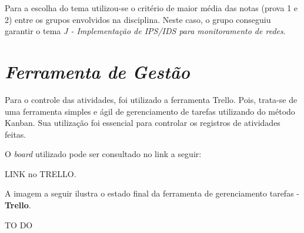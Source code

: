 		Para a escolha do tema utilizou-se o critério de maior média das notas (prova 1 e 2) entre os grupos envolvidos na disciplina. Neste caso, o grupo conseguiu garantir o tema \emph{J - Implementação de IPS/IDS para monitoramento de redes}.  

	\section[Ferramenta de Gestão]{\emph{Ferramenta de Gestão}}
	\label{sec:informacoesGerais_ferramenta}

		Para o controle das atividades, foi utilizado a ferramenta Trello. Pois, trata-se de uma ferramenta simples e ágil de gerenciamento de tarefas utilizando do método Kanban. Sua utilização foi essencial para controlar os registros de atividades feitas.

		O \emph{board} utilizado pode ser consultado no link a seguir:

		LINK no TRELLO.

		A imagem a seguir ilustra o estado final da ferramenta de gerenciamento tarefas - \textbf{Trello}.
		\newpage

		\begin{landscape}
			TO DO
		\end{landscape}